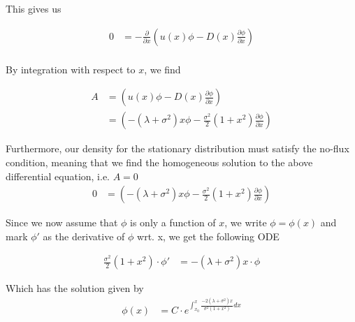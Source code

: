 \documentclass[a4paper,12pt]{article}
\begin{document}
This gives us

\begin{equation*}
\begin{aligned}
0&=-\frac{\partial}{\partial x}(u(x) \phi -D(x)\frac{\partial \phi}{\partial x})\\
\end{aligned}
\end{equation*}

By integration with respect to $x$, we find

\begin{equation*}
\begin{aligned}
A&=(u(x) \phi -D(x)\frac{\partial \phi}{\partial x})\\
&=(-(\lambda+\sigma^2) x \phi -\frac{\sigma^2}{2} (1+x^2)\frac{\partial \phi}{\partial x})
\end{aligned}
\end{equation*}

Furthermore, our density for the stationary distribution must satisfy the no-flux condition, meaning that we find the homogeneous solution to the above differential equation, i.e. $A=0$\\


\begin{equation*}
\begin{aligned}
0&=(-(\lambda+\sigma^2) x \phi -\frac{\sigma^2}{2} (1+x^2)\frac{\partial \phi}{\partial x})
\end{aligned}
\end{equation*}

Since we now assume that $\phi$ is only a function of $x$, we write $\phi=\phi(x)$ and mark $\phi'$ as the derivative of $\phi$ wrt. x, we get the following ODE


\begin{equation*}
\begin{aligned}
\frac{\sigma^2}{2} (1+x^2)\cdot \phi'&=-(\lambda+\sigma^2) x\cdot \phi
\end{aligned}
\end{equation*}

Which has the solution given by\\

\begin{equation*}
\begin{aligned}
\phi(x)&=C\cdot e^{\int_{x_0}^x \frac{-2(\lambda+\sigma^2)x}{\sigma^2(1+x^2)} dx}
\end{aligned}
\end{equation*}
\end{document}
